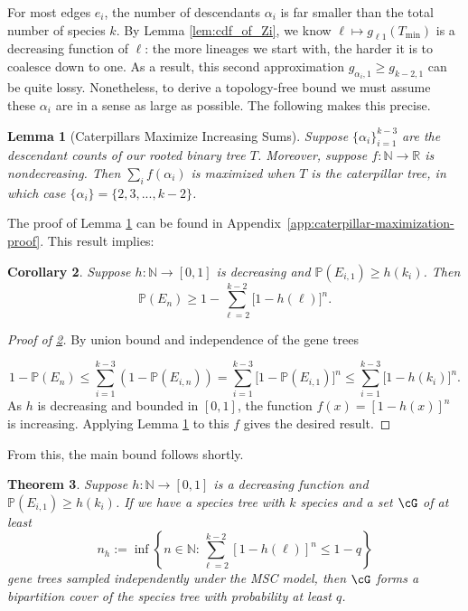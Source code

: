 \documentclass[10pt,oneside,reqno]{article}
\theoremstyle{plain}
\newtheorem{theorem}{Theorem}[section]
\newtheorem{lemma}[theorem]{Lemma}
\newtheorem{corollary}[theorem]{Corollary}
\theoremstyle{definition}
\numberwithin{equation}{section}
\renewcommand{\leq}{\leqslant}
\renewcommand{\geq}{\geqslant}
\newcommand{\R}{\mathbb{R}}
\newcommand{\N}{\mathbb{N}}
\renewcommand{\P}{\mathbb{P}}
\begin{document}
For most edges $e_i$, the number of descendants $\alpha_{i}$ is far smaller than the total number of species $k$. 
By Lemma \ref{lem:cdf_of_Zi}, we know $\ell \mapsto g_{\ell 1}(T_{\mathrm{min}})$ is a 
decreasing function of $\ell$: the more lineages we start with, the harder it is to coalesce down to one.
As a result, this second approximation $g_{\alpha_{i}, 1} \geq g_{k-2, 1}$ can be quite lossy. Nonetheless, to derive 
a topology-free bound we must assume these $\alpha_i$ are in a sense as large
as possible. The following makes this precise.

\begin{lemma}[Caterpillars Maximize Increasing Sums]
Suppose $\{\alpha_{i}\}_{i=1}^{k-3}$ are the descendant counts of our rooted binary tree $T$. Moreover, suppose $f: \N \to \R$ is nondecreasing. Then $\sum_i f(\alpha_{i})$ is maximized when $T$ is the caterpillar tree, in which case $\{\alpha_{i}\} = \{2,3,..., k-2\}$. 

\label{lem:caterpillar_maximize_increasing_sums}
\end{lemma}

\noindent The proof of Lemma \ref{lem:caterpillar_maximize_increasing_sums} can be found 
in Appendix~\ref{app:caterpillar-maximization-proof}. 
This result implies:

\begin{corollary}
Suppose $h: \N \to [0,1]$ is decreasing and $\P(E_{i,1}) \geq h(k_i)$. Then
%
\[\P(E_n) \geq 1 - \sum_{\ell = 2}^{k-2} \Big[1 - h(\ell)\Big]^n.\]
%
\label{corr:bipartitions_corollary}    
\end{corollary}

\begin{proof}[Proof of \ref{corr:bipartitions_corollary}]
    By union bound and independence of the gene trees

    \[1-\P(E_n)  \leq  \sum_{i=1}^{k-3} (1-\P(E_{i,n})) =  \sum_{i=1}^{k-3} \Big[1-\P(E_{i,1})\Big]^n \leq  \sum_{i=1}^{k-3} \Big[1-h(k_i)\Big]^n. \]
%
\noindent  As $h$ is decreasing and bounded in $[0,1]$, the function $f(x) = [1-h(x)]^n$ is increasing. Applying Lemma \ref{lem:caterpillar_maximize_increasing_sums} to this $f$ gives the desired result.
\end{proof}

\noindent From this, the main bound follows shortly.

\begin{theorem}
    Suppose $h: \N \to [0,1]$ is a decreasing function and $\P(E_{i,1}) \geq h(k_i)$. If we have a species tree with $k$ species and a set $\cG$ of at least
%
\begin{equation}
    n_h := \inf\left\{n \in \N : \sum_{\ell=2}^{k-2}\left[1-h(\ell)\right]^n \leq 1-q\right\}
\end{equation}
%
\noindent gene trees sampled independently under the MSC model, then $\cG$ forms a bipartition cover of the species tree with probability at least $q$.
\label{thm:caterpillar_bound}
\end{theorem}
\end{document}
